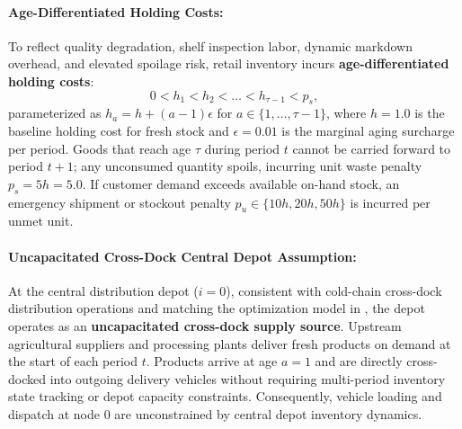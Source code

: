 \documentclass[11pt,a4paper]{article}
\theoremstyle{definition}
\theoremstyle{remark}
\begin{document}
\paragraph{Age-Differentiated Holding Costs:}
To reflect quality degradation, shelf inspection labor, dynamic markdown overhead, and elevated spoilage risk, retail inventory incurs \textbf{age-differentiated holding costs}:
\begin{equation}
    0 < h_1 < h_2 < \dots < h_{\tau-1} < p_s, \label{eq:age_holding_costs}
\end{equation}
parameterized as $h_a = h + (a - 1)\epsilon$ for $a \in \{1, \dots, \tau-1\}$, where $h = 1.0$ is the baseline holding cost for fresh stock and $\epsilon = 0.01$ is the marginal aging surcharge per period. Goods that reach age $\tau$ during period $t$ cannot be carried forward to period $t+1$; any unconsumed quantity spoils, incurring unit waste penalty $p_s = 5h = 5.0$. If customer demand exceeds available on-hand stock, an emergency shipment or stockout penalty $p_u \in \{10h, 20h, 50h\}$ is incurred per unmet unit.

\paragraph{Uncapacitated Cross-Dock Central Depot Assumption:}
At the central distribution depot ($i = 0$), consistent with cold-chain cross-dock distribution operations \citep{nahmias1982perishable,coelho2014optimal} and matching the optimization model in , the depot operates as an \textbf{uncapacitated cross-dock supply source}. Upstream agricultural suppliers and processing plants deliver fresh products on demand at the start of each period $t$. Products arrive at age $a = 1$ and are directly cross-docked into outgoing delivery vehicles without requiring multi-period inventory state tracking or depot capacity constraints. Consequently, vehicle loading and dispatch at node $0$ are unconstrained by central depot inventory dynamics.
\end{document}
